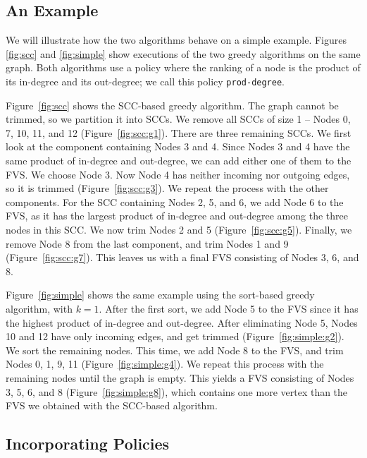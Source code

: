 \subsection{An Example}\label{subsec:alg_example}

We will illustrate how the two algorithms behave on a simple example. Figures \ref{fig:scc} and \ref{fig:simple} show executions of the two greedy algorithms on the same graph. Both algorithms use a policy where the ranking of a node is the product of its in-degree and its out-degree; we call this policy \texttt{prod-degree}.

Figure~\ref{fig:scc} shows the SCC-based greedy algorithm. The graph cannot be trimmed, so we partition it into SCCs. We remove all SCCs of size 1 --  Nodes 0, 7, 10, 11, and 12 (Figure~\ref{fig:scc:g1}). There are three remaining SCCs. We first look at the component containing Nodes 3 and 4. Since Nodes 3 and 4 have the same product of in-degree and out-degree, we can add either one of them to the FVS. We choose Node 3. Now Node 4 has neither incoming nor outgoing edges, so it is trimmed (Figure~\ref{fig:scc:g3}). We repeat the process with the other components. For the SCC containing Nodes 2, 5, and 6, we add Node 6 to the FVS, as it has the largest product of in-degree and out-degree among the three nodes in this SCC. We now trim Nodes 2 and 5 (Figure~\ref{fig:scc:g5}). Finally, we remove Node 8 from the last component, and trim Nodes 1 and 9 (Figure~\ref{fig:scc:g7}). This leaves us with a final FVS consisting of Nodes 3, 6, and 8.

Figure~\ref{fig:simple} shows the same example using the sort-based greedy algorithm, with $k = 1$. After the first sort, we add Node 5 to the FVS since it has the highest product of in-degree and out-degree. After eliminating Node 5, Nodes 10 and 12 have only incoming edges, and get trimmed (Figure~\ref{fig:simple:g2}). We sort the remaining nodes. This time, we add Node 8 to the FVS, and trim Nodes 0, 1, 9, 11 (Figure~\ref{fig:simple:g4}). We repeat this process with the remaining nodes until the graph is empty. This yields a FVS consisting of Nodes 3, 5, 6, and 8 (Figure~\ref{fig:simple:g8}), which contains one more vertex than the FVS we obtained with the SCC-based algorithm.


\subsection{Incorporating Policies}
\label{subsec:validator_reordering:policy}

